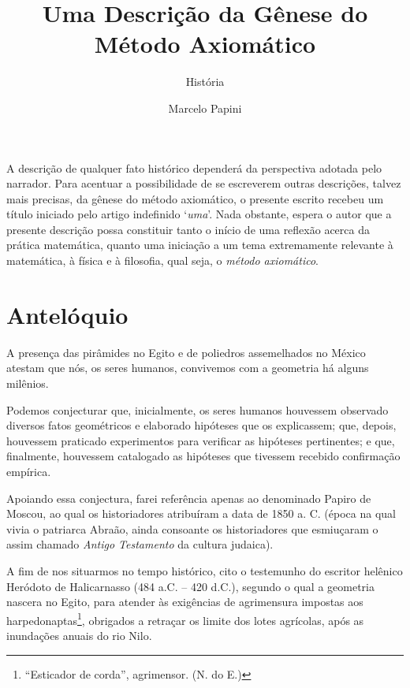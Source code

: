 \documentclass{hipatia}
\title{Uma Descrição da Gênese do\\ Método Axiomático}
\subtitle{História}
\author{Marcelo Papini
}
\begin{document}
\setcounter{page}{\historiapage}
\maketitle


A descrição de qualquer fato histórico dependerá da perspectiva adotada pelo narrador. Para   acentuar a possibilidade de se escreverem outras descrições, talvez mais precisas, da gênese do método axiomático, o presente escrito recebeu um título iniciado pelo artigo indefinido ‘\emph{uma}’.
Nada obstante, espera o autor que a presente descrição possa constituir tanto o início de uma reflexão acerca da prática matemática, quanto uma iniciação a um tema extremamente relevante à matemática, à física e à filosofia, qual seja, o \emph{método axiomático}.







\section{Antelóquio}

A presença das pirâmides no Egito e de poliedros assemelhados no México atestam que nós, os seres humanos, convivemos  com a geometria há alguns milênios. 

Podemos conjecturar que, inicialmente, os seres humanos houvessem observado diversos fatos geométricos e elaborado hipóteses que os explicassem;  que, depois, houvessem praticado experimentos para verificar as hipóteses pertinentes;  e que, finalmente, houvessem catalogado as hipóteses que tivessem recebido confirmação empírica. 

Apoiando essa conjectura, farei referência apenas ao denominado Papiro de Moscou, ao qual os historiadores atribuíram a data de 1850 a. C.  (época na qual vivia o patriarca Abraão, ainda consoante os historiadores que esmiuçaram o assim chamado \emph{Antigo Testamento} da cultura judaica).

A fim de nos situarmos no tempo histórico, cito o testemunho do escritor helênico Heródoto de Halicarnasso (484 a.C. – 420 d.C.), segundo o qual a geometria nascera no Egito, para atender às exigências de agrimensura impostas aos harpedonaptas\footnote{``Esticador de corda'', agrimensor. (N. do E.)}, obrigados a retraçar os limite dos lotes agrícolas, após as inundações anuais do rio Nilo. 
\end{document}
